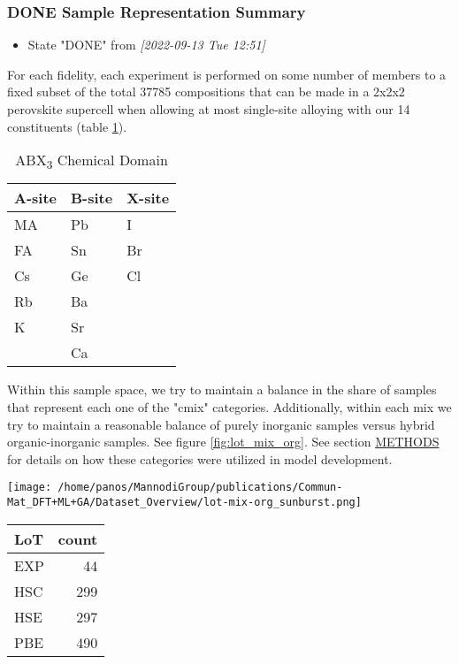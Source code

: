 \documentclass[aip, jmp, amsmath, amssymb]{revtex4-2}
\begin{document}
\subsubsection*{{\bfseries\sffamily DONE} Sample Representation Summary}
\label{sec:orgc99d77b}
\begin{itemize}
\item State "DONE"       from              \textit{[2022-09-13 Tue 12:51]}
\end{itemize}
For each fidelity, each experiment is performed on some number of
members to a fixed subset of the total 37785 compositions that can be
made in a 2x2x2 perovskite supercell when allowing at most single-site
alloying with our 14 constituents (table \ref{tbl:site_tbl}).

\begin{table}[htbp]
\caption{\label{tbl:site_tbl} ABX\textsubscript{3} Chemical Domain}
\centering
\begin{tabular}{lll}
A-site & B-site & X-site\\
\hline
MA & Pb & I\\
FA & Sn & Br\\
Cs & Ge & Cl\\
Rb & Ba & \\
K & Sr & \\
 & Ca & \\
\end{tabular}
\end{table}

Within this sample space, we try to maintain a balance in the share of
samples that represent each one of the "\gls{cmix}"
categories. Additionally, within each mix we try to maintain a
reasonable balance of purely inorganic samples versus hybrid
organic-inorganic samples. See figure \ref{fig:lot_mix_org}. See section
\hyperref[sec:org6992cbf]{METHODS} for details on how these categories were utilized in model
development.

\begin{figure*}
\centering
\texttt{[image: /home/panos/MannodiGroup/publications/Commun-Mat\_DFT+ML+GA/Dataset\_Overview/lot-mix-org\_sunburst.png]}
\caption{\label{fig:lot_mix_org} Share by count of total data apportioned from each experimental subcategory}
\end{figure*}

\begin{center}
\begin{tabular}{lr}
LoT & count\\
\hline
EXP & 44\\
HSC & 299\\
HSE & 297\\
PBE & 490\\
\end{tabular}
\end{center}
\end{document}
